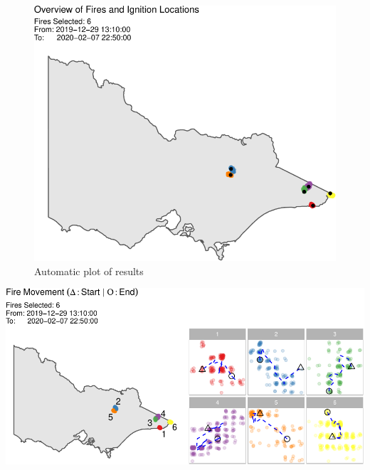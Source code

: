 \begin{Schunk}
\begin{figure}

{\centering \includegraphics[width=0.8\linewidth]{clustering_paper_files/figure-latex/unnamed-chunk-8-1} 

}

\caption[Automatic plot of results]{Automatic plot of results}\label{fig:unnamed-chunk-8}
\end{figure}
\end{Schunk}

\begin{Schunk}


\begin{center}\includegraphics[width=1\linewidth]{clustering_paper_files/figure-latex/unnamed-chunk-9-1} \end{center}

\end{Schunk}

